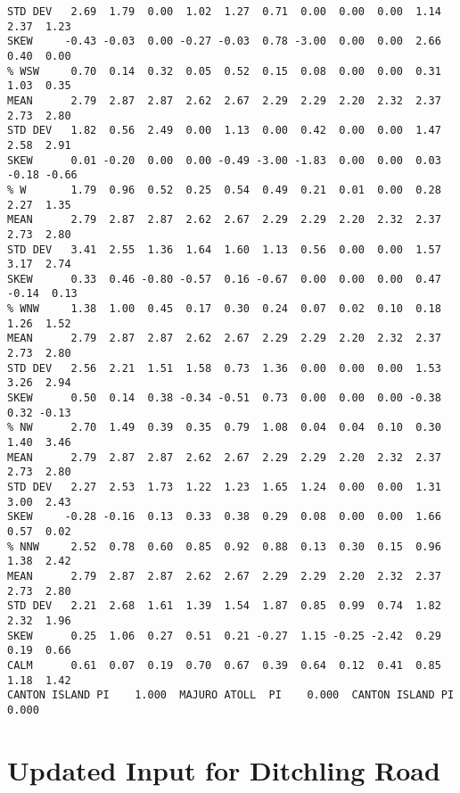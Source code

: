 \begin{verbatim}
STD DEV   2.69  1.79  0.00  1.02  1.27  0.71  0.00  0.00  0.00  1.14  2.37  1.23
SKEW     -0.43 -0.03  0.00 -0.27 -0.03  0.78 -3.00  0.00  0.00  2.66  0.40  0.00
% WSW     0.70  0.14  0.32  0.05  0.52  0.15  0.08  0.00  0.00  0.31  1.03  0.35
MEAN      2.79  2.87  2.87  2.62  2.67  2.29  2.29  2.20  2.32  2.37  2.73  2.80
STD DEV   1.82  0.56  2.49  0.00  1.13  0.00  0.42  0.00  0.00  1.47  2.58  2.91
SKEW      0.01 -0.20  0.00  0.00 -0.49 -3.00 -1.83  0.00  0.00  0.03 -0.18 -0.66
% W       1.79  0.96  0.52  0.25  0.54  0.49  0.21  0.01  0.00  0.28  2.27  1.35
MEAN      2.79  2.87  2.87  2.62  2.67  2.29  2.29  2.20  2.32  2.37  2.73  2.80
STD DEV   3.41  2.55  1.36  1.64  1.60  1.13  0.56  0.00  0.00  1.57  3.17  2.74
SKEW      0.33  0.46 -0.80 -0.57  0.16 -0.67  0.00  0.00  0.00  0.47 -0.14  0.13
% WNW     1.38  1.00  0.45  0.17  0.30  0.24  0.07  0.02  0.10  0.18  1.26  1.52
MEAN      2.79  2.87  2.87  2.62  2.67  2.29  2.29  2.20  2.32  2.37  2.73  2.80
STD DEV   2.56  2.21  1.51  1.58  0.73  1.36  0.00  0.00  0.00  1.53  3.26  2.94
SKEW      0.50  0.14  0.38 -0.34 -0.51  0.73  0.00  0.00  0.00 -0.38  0.32 -0.13
% NW      2.70  1.49  0.39  0.35  0.79  1.08  0.04  0.04  0.10  0.30  1.40  3.46
MEAN      2.79  2.87  2.87  2.62  2.67  2.29  2.29  2.20  2.32  2.37  2.73  2.80
STD DEV   2.27  2.53  1.73  1.22  1.23  1.65  1.24  0.00  0.00  1.31  3.00  2.43
SKEW     -0.28 -0.16  0.13  0.33  0.38  0.29  0.08  0.00  0.00  1.66  0.57  0.02
% NNW     2.52  0.78  0.60  0.85  0.92  0.88  0.13  0.30  0.15  0.96  1.38  2.42
MEAN      2.79  2.87  2.87  2.62  2.67  2.29  2.29  2.20  2.32  2.37  2.73  2.80
STD DEV   2.21  2.68  1.61  1.39  1.54  1.87  0.85  0.99  0.74  1.82  2.32  1.96
SKEW      0.25  1.06  0.27  0.51  0.21 -0.27  1.15 -0.25 -2.42  0.29  0.19  0.66
CALM      0.61  0.07  0.19  0.70  0.67  0.39  0.64  0.12  0.41  0.85  1.18  1.42
CANTON ISLAND PI    1.000  MAJURO ATOLL  PI    0.000  CANTON ISLAND PI    0.000
\end{verbatim}

\section{Updated Input for Ditchling Road}
\label{sec:UpdatedInputForDitchlingRoad}

\scriptsize

